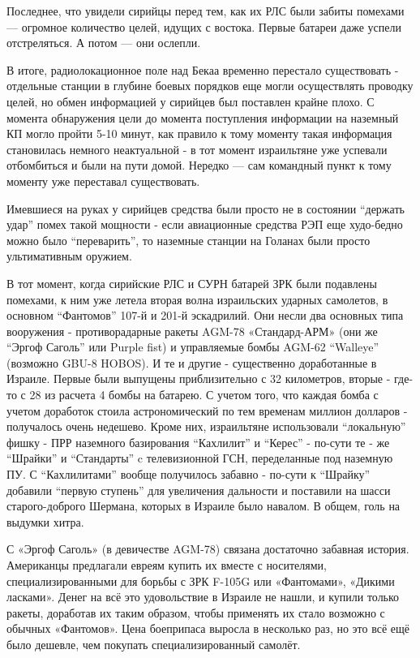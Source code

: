 Последнее, что увидели сирийцы перед тем, как их РЛС были забиты помехами — огромное количество целей, идущих с востока. Первые батареи даже успели отстреляться. А потом — они ослепли.

В итоге, радиолокационное поле над Бекаа временно перестало существовать - отдельные станции в глубине боевых порядков еще могли осуществлять проводку целей, но обмен информацией у сирийцев был поставлен крайне плохо. С момента обнаружения цели до момента поступления информации на наземный КП могло пройти 5-10 минут, как правило к тому моменту такая информация становилась немного неактуальной - в тот момент израильтяне уже успевали отбомбиться и были на пути домой. Нередко — сам командный пункт к тому моменту уже переставал существовать.

Имевшиеся на руках у сирийцев средства были просто не в состоянии “держать удар” помех такой мощности - если авиационные средства РЭП еще худо-бедно можно было “переварить”, то наземные станции на Голанах были просто ультимативным оружием.

В тот момент, когда сирийские РЛС и СУРН батарей ЗРК были подавлены помехами, к ним уже летела вторая волна израильских ударных самолетов, в основном “Фантомов” 107-й и 201-й эскадрилий. Они несли два основных типа вооружения - противорадарные ракеты AGM-78 «Стандард-АРМ» (они же “Эргоф Саголь” или Purple fist) и управляемые бомбы AGM-62 “Walleye” (возможно GBU-8 HOBOS). И те и другие - существенно доработанные в Израиле. Первые были выпущены приблизительно с 32 километров, вторые - где-то с 28 из расчета 4 бомбы на батарею. С учетом того, что каждая бомба с учетом доработок стоила астрономический по тем временам миллион долларов - получалось очень недешево. Кроме них, израильтяне использовали “локальную” фишку - ПРР наземного базирования “Кахлилит” и “Керес” - по-сути те - же “Шрайки” и “Стандарты” c телевизионной ГСН, переделанные под наземную ПУ. С “Кахлилитами” вообще получилось забавно - по-сути к “Шрайку” добавили “первую ступень” для увеличения дальности и поставили на шасси старого-доброго Шермана, которых в Израиле было навалом. В общем, голь на выдумки хитра.

С «Эргоф Саголь» (в девичестве AGM-78) связана достаточно забавная история. Американцы предлагали евреям купить их вместе с носителями, специализированными для борьбы с ЗРК F-105G или «Фантомами», «Дикими ласками». Денег на всё это удовольствие в Израиле не нашли, и купили только ракеты, доработав их таким образом, чтобы применять их стало возможно с обычных «Фантомов». Цена боеприпаса выросла в несколько раз, но это всё ещё было дешевле, чем покупать специализированный самолёт.

